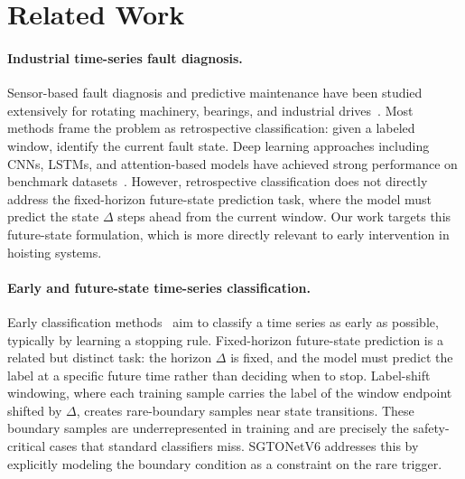 \section{Related Work}
\label{sec:related}

\paragraph{Industrial time-series fault diagnosis.}
Sensor-based fault diagnosis and predictive maintenance have been studied extensively for rotating machinery, bearings, and industrial drives~\cite{lei2020machinery,zhao2019deep}.
Most methods frame the problem as retrospective classification: given a labeled window, identify the current fault state.
Deep learning approaches including CNNs, LSTMs, and attention-based models have achieved strong performance on benchmark datasets~\cite{zhang2019deep}.
However, retrospective classification does not directly address the fixed-horizon future-state prediction task, where the model must predict the state $\Delta$ steps ahead from the current window.
Our work targets this future-state formulation, which is more directly relevant to early intervention in hoisting systems.

\paragraph{Early and future-state time-series classification.}
Early classification methods~\cite{mori2017early,schafer2020teaser} aim to classify a time series as early as possible, typically by learning a stopping rule.
Fixed-horizon future-state prediction is a related but distinct task: the horizon $\Delta$ is fixed, and the model must predict the label at a specific future time rather than deciding when to stop.
Label-shift windowing, where each training sample carries the label of the window endpoint shifted by $\Delta$, creates rare-boundary samples near state transitions.
These boundary samples are underrepresented in training and are precisely the safety-critical cases that standard classifiers miss.
SGTONetV6 addresses this by explicitly modeling the boundary condition as a constraint on the rare trigger.

